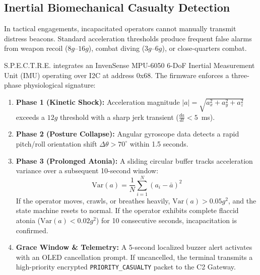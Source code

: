 \documentclass[conference]{IEEEtran}
\begin{document}
\subsection{Inertial Biomechanical Casualty Detection}
In tactical engagements, incapacitated operators cannot manually transmit distress beacons. Standard acceleration thresholds produce frequent false alarms from weapon recoil ($8g$--$16g$), combat diving ($3g$--$6g$), or close-quarters combat.

S.P.E.C.T.R.E. integrates an InvenSense MPU-6050 6-DoF Inertial Measurement Unit (IMU) operating over I2C at address 0x68. The firmware enforces a three-phase physiological signature:
\begin{enumerate}
    \item \textbf{Phase 1 (Kinetic Shock):} Acceleration magnitude $|a| = \sqrt{a_x^2 + a_y^2 + a_z^2}$ exceeds a $12g$ threshold with a sharp jerk transient ($\frac{da}{dt} < 5$~ms).
    \item \textbf{Phase 2 (Posture Collapse):} Angular gyroscope data detects a rapid pitch/roll orientation shift $\Delta \theta > 70^\circ$ within 1.5 seconds.
    \item \textbf{Phase 3 (Prolonged Atonia):} A sliding circular buffer tracks acceleration variance over a subsequent 10-second window:
    \begin{equation}
    \text{Var}(a) = \frac{1}{N} \sum_{i=1}^N (a_i - \bar{a})^2
    \end{equation}
    If the operator moves, crawls, or breathes heavily, $\text{Var}(a) > 0.05g^2$, and the state machine resets to normal. If the operator exhibits complete flaccid atonia ($\text{Var}(a) < 0.02g^2$) for 10 consecutive seconds, incapacitation is confirmed.
    \item \textbf{Grace Window \& Telemetry:} A 5-second localized buzzer alert activates with an OLED cancellation prompt. If uncancelled, the terminal transmits a high-priority encrypted \texttt{PRIORITY\_CASUALTY} packet to the C2 Gateway.
\end{enumerate}
\end{document}
